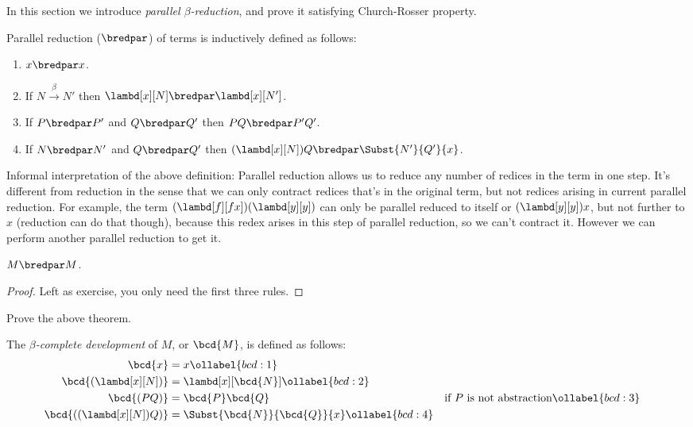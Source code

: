\documentclass[../../../include/open-logic-section]{subfiles}
\begin{document}


In this section we introduce \emph{parallel $\beta$-reduction}, and
prove it satisfying Church-Rosser property.

\begin{defn} 
  Parallel reduction ($\bredpar$) of terms is inductively defined as follows:
  \begin{enumerate}
    \item {} $x \bredpar x$.
    \item {} If $N \xrightarrow{\beta} N'$ then $\lambd[x][N] \bredpar
      \lambd[x][N']$.
    \item {} If $P \bredpar P'$ and $Q \bredpar Q'$ then $PQ \bredpar
      P'Q'$.
    \item {} If $N \bredpar N'$ and $Q \bredpar Q'$ then
      $(\lambd[x][N])Q \bredpar \Subst{N'}{Q'}{x}$.
  \end{enumerate}
\end{defn}

Informal interpretation of the above definition: Parallel reduction allows us to reduce any number of redices in the
term in one step. It's different from reduction in the sense that we
can only contract redices that's in the original term, but not redices
arising in current parallel reduction. For example, the term
$(\lambd[f][fx])(\lambd[y][y])$ can only be parallel reduced
to itself or $(\lambd[y][y])x$, but not further to $x$ (reduction can do
that though), because this redex arises in this step of parallel reduction,
so we can't contract it. However we can perform another parallel
reduction      to get it.

\begin{thm}
  $M \bredpar M$.
\end{thm}
\begin{proof}
  Left as exercise, you only need the first three rules.
\end{proof}

\begin{prob}
  Prove the above theorem.
\end{prob}

\begin{defn}
  The \emph{$\beta$-complete development} of $M$, or $\bcd{M}$, is defined
  as follows:
  \begin{align}
    \bcd{x} &= x \ollabel{bcd:1} \\
    \bcd{(\lambd[x][N])} &= \lambd[x][\bcd{N}] \ollabel{bcd:2}\\
    \bcd{(PQ)} &= \bcd{P}\bcd{Q} && \text{if $P$ is not abstraction} \ollabel{bcd:3} \\
    \bcd{((\lambd[x][N])Q)} &= \Subst{\bcd{N}}{\bcd{Q}}{x} \ollabel{bcd:4}
  \end{align}
\end{defn}
\end{document}
